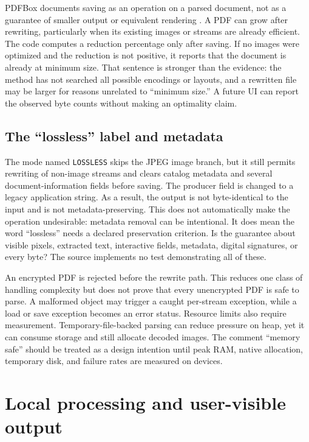 \documentclass[10pt,letterpaper]{article}
\begin{document}
PDFBox documents saving as an operation on a parsed document, not as a guarantee of smaller output or equivalent rendering \cite{pdfbox}. A PDF can grow after rewriting, particularly when its existing images or streams are already efficient. The code computes a reduction percentage only after saving. If no images were optimized and the reduction is not positive, it reports that the document is already at minimum size. That sentence is stronger than the evidence: the method has not searched all possible encodings or layouts, and a rewritten file may be larger for reasons unrelated to ``minimum size.'' A future UI can report the observed byte counts without making an optimality claim.

\subsection{The ``lossless'' label and metadata}

The mode named \texttt{LOSSLESS} skips the JPEG image branch, but it still permits rewriting of non-image streams and clears catalog metadata and several document-information fields before saving. The producer field is changed to a legacy application string. As a result, the output is not byte-identical to the input and is not metadata-preserving. This does not automatically make the operation undesirable: metadata removal can be intentional. It does mean the word ``lossless'' needs a declared preservation criterion. Is the guarantee about visible pixels, extracted text, interactive fields, metadata, digital signatures, or every byte? The source implements no test demonstrating all of these.

An encrypted PDF is rejected before the rewrite path. This reduces one class of handling complexity but does not prove that every unencrypted PDF is safe to parse. A malformed object may trigger a caught per-stream exception, while a load or save exception becomes an error status. Resource limits also require measurement. Temporary-file-backed parsing can reduce pressure on heap, yet it can consume storage and still allocate decoded images. The comment ``memory safe'' should be treated as a design intention until peak RAM, native allocation, temporary disk, and failure rates are measured on devices.

\section{Local processing and user-visible output}
\end{document}
